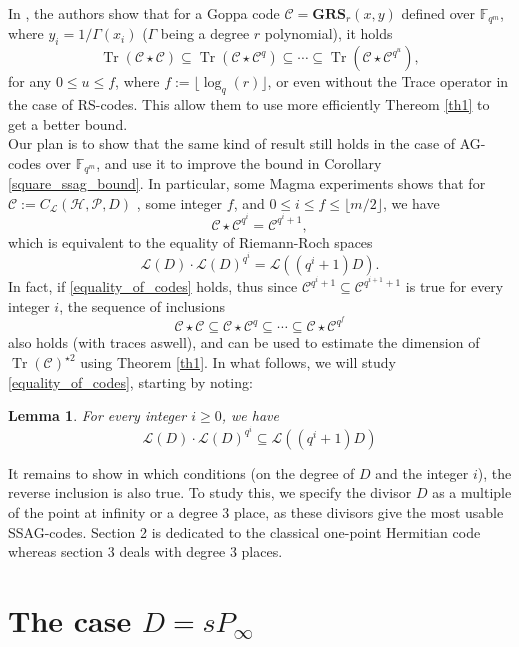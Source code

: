 \documentclass[a4paper]{article}
\newtheorem{lem1}{Lemma}
\newcommand{\calH}{\mathcal{H}}
\newcommand{\calL}{\mathcal{L}}
\newcommand{\calC}{\mathcal{C}}
\newcommand{\Tr}{\operatorname{Tr}}
\begin{document}
In \cite{rocco}, the authors show that for a Goppa code $\calC = \mathbf{GRS}_r(x,y)$ defined over $\mathbb{F}_{q^m}$, where $y_i = 1/\Gamma(x_i)$ ($\Gamma$ being a degree $r$ polynomial), it holds
\[\Tr(\calC\star\calC) \subseteq \Tr(\calC\star\calC^{q}) \subseteq \cdots \subseteq \Tr(\calC\star\calC^{q^u}),\]
for any $0 \leq u \leq f$,
where $f :=\lfloor\log_q(r)\rfloor $, or even without the Trace operator in the case of RS-codes. This allow them to use more efficiently Thereom \ref{th1} to get a better bound. \\
Our plan is to show that the same kind of result still holds in the case of AG-codes over $\mathbb{F}_{q^m}$, and use it to improve the bound in Corollary \ref{square_ssag_bound}. In particular, some Magma experiments shows that for $\mathcal{C} := C_{\calL}(\calH,\mathcal{P},D)$ , some integer $f$, and $0 \leq i \leq f \leq \lfloor m/2 \rfloor$, we have
\begin{equation} \label{equality_of_codes}
 \calC \star \calC^{q^i} = \calC^{q^i+1},
\end{equation}
which is equivalent to the equality of Riemann-Roch spaces
\[ \calL(D) \cdot \calL(D)^{q^i} = \calL((q^i+1)D).\]
In fact, if \eqref{equality_of_codes} holds, thus since 
$\calC^{q^i+1} \subseteq \calC^{q^{i+1}+1}$ is true for every integer $i$, the sequence of inclusions 
\[\calC\star\calC \subseteq \calC\star\calC^{q} \subseteq \cdots \subseteq \calC\star\calC^{q^f}\]
also holds (with traces aswell), and can be used to estimate the dimension of $\Tr(\calC)^{\star2}$ using Theorem \ref{th1}.
In what follows, we will study \eqref{equality_of_codes}, starting by noting: 

\begin{lem1} \label{lemma1}
For every integer $i \geq 0$, we have
\[\calL(D) \cdot \calL(D)^{q^i} \subseteq \calL((q^i+1)D)\]
\end{lem1}

It remains to show in which conditions (on the degree of $D$ and the integer $i$), the reverse inclusion is also true. To study this, we specify the divisor $D$ as a multiple of the point at infinity or a degree 3 place, as these divisors give the most usable SSAG-codes. Section 2 is dedicated to the classical one-point Hermitian code whereas section 3 deals with degree 3 places.


\section{The case $D=sP_{\infty}$}
\end{document}

